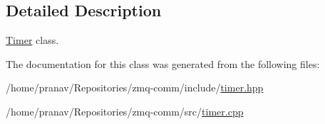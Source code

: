 \subsection{Detailed Description}
\hyperlink{classTimer}{Timer} class. 

The documentation for this class was generated from the following files\+:\begin{DoxyCompactItemize}
\item 
/home/pranav/\+Repositories/zmq-\/comm/include/\hyperlink{timer_8hpp}{timer.\+hpp}\item 
/home/pranav/\+Repositories/zmq-\/comm/src/\hyperlink{timer_8cpp}{timer.\+cpp}\end{DoxyCompactItemize}
